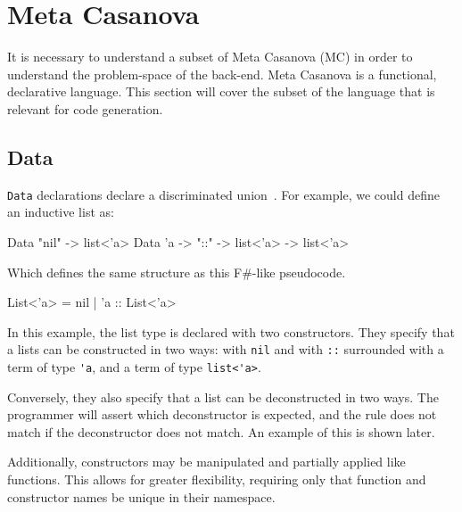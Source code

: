 \section{Meta Casanova}\label{metacasanova}
It is necessary to understand a subset of Meta Casanova (MC) in order to understand the problem-space of the back-end.
Meta Casanova is a functional, declarative language.
This section will cover the subset of the language that is relevant for code generation.

\subsection{Data}\label{mcdata}
\texttt{Data} declarations declare a discriminated union~\cite{algebraic_datastructures}.
For example, we could define an inductive list as:

\begin{MC}
Data "nil" -> list<'a>
Data 'a -> "::" -> list<'a> -> list<'a>
\end{MC}

Which defines the same structure as this F\#-like pseudocode.

\begin{FS}
List<'a> = nil 
         | 'a :: List<'a>
\end{FS}

In this example, the list type is declared with two constructors.
They specify that a lists can be constructed in two ways: with \verb|nil| and with \verb|::| surrounded with a term of type \verb|'a|, and a term of type \verb|list<'a>|.

Conversely, they also specify that a list can be deconstructed in two ways.
The programmer will assert which deconstructor is expected, and the rule does not match if the deconstructor does not match.
An example of this is shown later.

Additionally, constructors may be manipulated and partially applied like functions.
This allows for greater flexibility, requiring only that function and constructor names be unique in their namespace.

%
%

